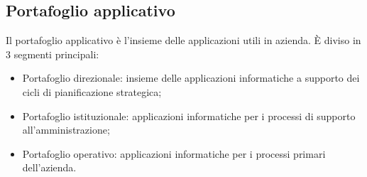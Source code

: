 \documentclass[a4paper, 11pt]{article}
\begin{document}
	\subsection{Portafoglio applicativo}
	Il portafoglio applicativo è l'insieme delle applicazioni utili in azienda. È diviso in 3 segmenti principali: \begin{itemize}
		\item Portafoglio direzionale: insieme delle applicazioni informatiche a supporto dei cicli di pianificazione strategica;
		
		\item Portafoglio istituzionale: applicazioni informatiche per i processi di supporto all’amministrazione;
		
		\item Portafoglio operativo: applicazioni informatiche per i processi primari dell’azienda.
	\end{itemize}
	
	
	
	
	
	
	
	
	
	
\end{document}
